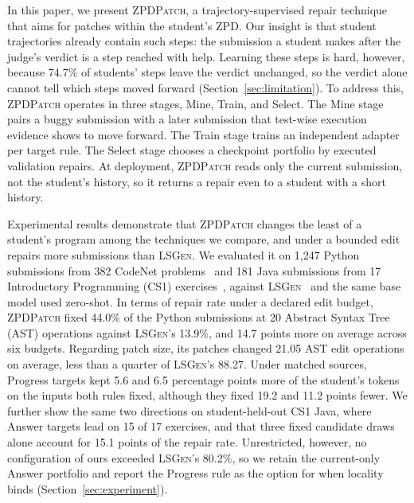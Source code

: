 \documentclass[10pt,conference]{IEEEtran}
\begin{document}
In this paper, we present \textsc{ZPDPatch}, a trajectory-supervised repair technique that aims for patches within the student's ZPD. Our insight is that student trajectories already contain such steps: the submission a student makes after the judge's verdict is a step reached with help. Learning these steps is hard, however, because 74.7\% of students' steps leave the verdict unchanged, so the verdict alone cannot tell which steps moved forward (Section~\ref{sec:limitation}). To address this, \textsc{ZPDPatch} operates in three stages, Mine, Train, and Select. The Mine stage pairs a buggy submission with a later submission that test-wise execution evidence shows to move forward. The Train stage trains an independent adapter per target rule. The Select stage chooses a checkpoint portfolio by executed validation repairs. At deployment, \textsc{ZPDPatch} reads only the current submission, not the student's history, so it returns a repair even to a student with a short history.

Experimental results demonstrate that \textsc{ZPDPatch} changes the least of a student's program among the techniques we compare, and under a bounded edit repairs more submissions than \textsc{LSGen}. We evaluated it on 1,247 Python submissions from 382 CodeNet problems~\cite{puri2021codenet} and 181 Java submissions from 17 Introductory Programming (CS1) exercises~\cite{duan2025test}, against \textsc{LSGen}~\cite{dai2026learner} and the same base model used zero-shot. In terms of repair rate under a declared edit budget, \textsc{ZPDPatch} fixed 44.0\% of the Python submissions at 20 Abstract Syntax Tree (AST) operations against \textsc{LSGen}'s 13.9\%, and 14.7 points more on average across six budgets. Regarding patch size, its patches changed 21.05 AST edit operations on average, less than a quarter of \textsc{LSGen}'s 88.27. Under matched sources, Progress targets kept 5.6 and 6.5 percentage points more of the student's tokens on the inputs both rules fixed, although they fixed 19.2 and 11.2 points fewer. We further show the same two directions on student-held-out CS1 Java, where Answer targets lead on 15 of 17 exercises, and that three fixed candidate draws alone account for 15.1 points of the repair rate. Unrestricted, however, no configuration of ours exceeded \textsc{LSGen}'s 80.2\%, so we retain the current-only Answer portfolio and report the Progress rule as the option for when locality binds (Section~\ref{sec:experiment}).
\end{document}
